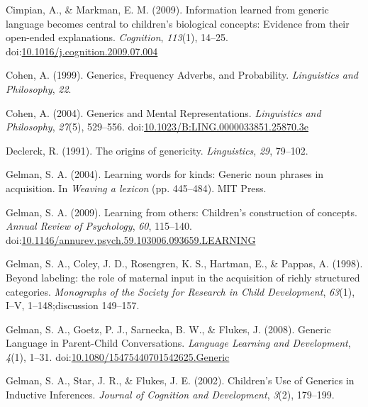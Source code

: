 \documentclass[,man,floatsintext]{apa6}
\theoremstyle{definition}
\theoremstyle{definition}
\theoremstyle{definition}
\theoremstyle{remark}
\begin{document}
\leavevmode\hypertarget{ref-Cimpian2009:explanations}{}%
Cimpian, A., \& Markman, E. M. (2009). Information learned from generic
language becomes central to children's biological concepts: Evidence
from their open-ended explanations. \emph{Cognition}, \emph{113}(1),
14--25.
doi:\href{https://doi.org/10.1016/j.cognition.2009.07.004}{10.1016/j.cognition.2009.07.004}

\leavevmode\hypertarget{ref-Cohen1999}{}%
Cohen, A. (1999). Generics, Frequency Adverbs, and Probability.
\emph{Linguistics and Philosophy}, \emph{22}.

\leavevmode\hypertarget{ref-Cohen2004}{}%
Cohen, A. (2004). Generics and Mental Representations. \emph{Linguistics
and Philosophy}, \emph{27}(5), 529--556.
doi:\href{https://doi.org/10.1023/B:LING.0000033851.25870.3e}{10.1023/B:LING.0000033851.25870.3e}

\leavevmode\hypertarget{ref-Declerck1991}{}%
Declerck, R. (1991). The origins of genericity. \emph{Linguistics},
\emph{29}, 79--102.

\leavevmode\hypertarget{ref-Gelman2004}{}%
Gelman, S. A. (2004). Learning words for kinds: Generic noun phrases in
acquisition. In \emph{Weaving a lexicon} (pp. 445--484). MIT Press.

\leavevmode\hypertarget{ref-Gelman2009}{}%
Gelman, S. A. (2009). Learning from others: Children's construction of
concepts. \emph{Annual Review of Psychology}, \emph{60}, 115--140.
doi:\href{https://doi.org/10.1146/annurev.psych.59.103006.093659.LEARNING}{10.1146/annurev.psych.59.103006.093659.LEARNING}

\leavevmode\hypertarget{ref-Gelman1998}{}%
Gelman, S. A., Coley, J. D., Rosengren, K. S., Hartman, E., \& Pappas,
A. (1998). Beyond labeling: the role of maternal input in the
acquisition of richly structured categories. \emph{Monographs of the
Society for Research in Child Development}, \emph{63}(1), I--V,
1--148;discussion 149--157.

\leavevmode\hypertarget{ref-Gelman2008}{}%
Gelman, S. A., Goetz, P. J., Sarnecka, B. W., \& Flukes, J. (2008).
Generic Language in Parent-Child Conversations. \emph{Language Learning
and Development}, \emph{4}(1), 1--31.
doi:\href{https://doi.org/10.1080/15475440701542625.Generic}{10.1080/15475440701542625.Generic}

\leavevmode\hypertarget{ref-Gelman2002}{}%
Gelman, S. A., Star, J. R., \& Flukes, J. E. (2002). Children's Use of
Generics in Inductive Inferences. \emph{Journal of Cognition and
Development}, \emph{3}(2), 179--199.
\end{document}
